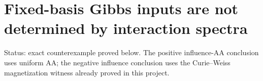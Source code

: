 \section{Fixed-basis Gibbs inputs are not determined by interaction
spectra}\label{proof:quantum_interactions}

Status: exact counterexample proved below. The positive influence-AA
conclusion uses uniform AA; the negative influence conclusion uses the Curie--Weiss
magnetization witness already proved in this project.







